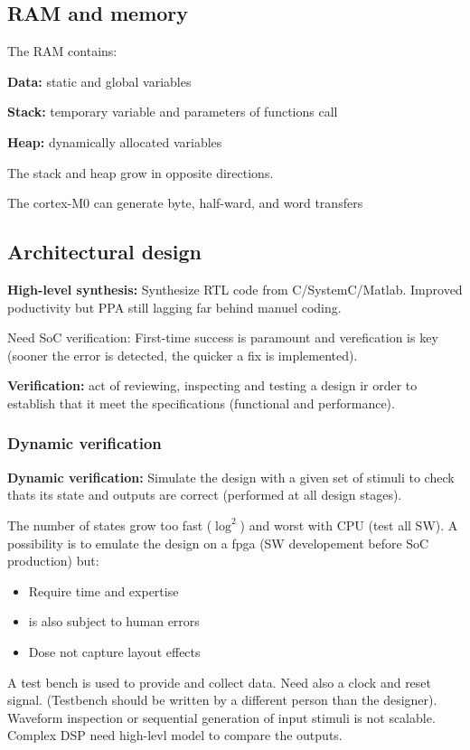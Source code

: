 \subsection{RAM and memory}
The RAM contains:

\textbf{Data:} static and global variables

\textbf{Stack:} temporary variable and parameters of functions call

\textbf{Heap:} dynamically allocated variables

The stack and heap grow in opposite directions.

The cortex-M0 can generate byte, half-ward, and word transfers

\subsection{Architectural design}

\textbf{High-level synthesis:} Synthesize RTL code from C/SystemC/Matlab. Improved poductivity but PPA still lagging far behind manuel coding.

Need SoC verification: First-time success is paramount and verefication is key (sooner the error is detected, the quicker a fix is implemented).

\textbf{Verification:} act of reviewing, inspecting and testing a design ir order to establish that it meet the specifications (functional and performance).

\subsubsection{Dynamic verification}
\textbf{Dynamic verification:} Simulate the design with a given set of stimuli to check thats its state and outputs are correct (performed at all design stages).

The number of states grow too fast (\(\log^2\)) and worst with CPU (test all SW). A possibility is to emulate the design on a fpga (SW developement before SoC production) but:
\begin{itemize}
  \item Require time and expertise
  \item is also subject to human errors
  \item Dose not capture layout effects
\end{itemize}

A test bench is used to provide and collect data. Need also a clock and reset signal. (Testbench should be written by a different person than the designer). Waveform inspection or sequential generation of input stimuli is not scalable. Complex DSP need high-levl model to compare the outputs.


